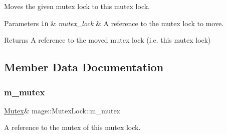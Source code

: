 Moves the given mutex lock to this mutex lock.


\begin{DoxyParams}[1]{Parameters}
\mbox{\tt in}  & {\em mutex\+\_\+lock} & A reference to the mutex lock to move. \\
\hline
\end{DoxyParams}
\begin{DoxyReturn}{Returns}
A reference to the moved mutex lock (i.\+e. this mutex lock) 
\end{DoxyReturn}


\subsection{Member Data Documentation}
\hypertarget{structmage_1_1_mutex_lock_a1c796e1e66bd49007fe746d1425b82f4}{}\label{structmage_1_1_mutex_lock_a1c796e1e66bd49007fe746d1425b82f4} 
\subsubsection{\texorpdfstring{m\+\_\+mutex}{m\_mutex}}
{\footnotesize\ttfamily \hyperlink{structmage_1_1_mutex}{Mutex}\& mage\+::\+Mutex\+Lock\+::m\+\_\+mutex\hspace{0.3cm}{\ttfamily [private]}}

A reference to the mutex of this mutex lock. 